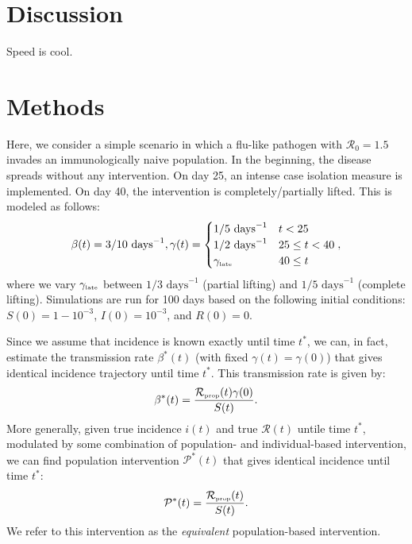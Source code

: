 \documentclass[12pt]{article}
\newcommand{\Rx}[1]{\ensuremath{{\mathcal R}_{#1}}\xspace}
\newcommand{\Ro}{\Rx{0}}
\newcommand{\RR}{\ensuremath{{\mathcal R}}\xspace}
\newcommand{\tsub}[2]{#1_{{\textrm{\tiny #2}}}}
\newcommand{\PP}{{\mathcal P}}
\begin{document}
\section{Discussion}

Speed is cool.

\section{Methods}


Here, we consider a simple scenario in which a flu-like pathogen with $\Ro = 1.5$ invades an immunologically naive population.
In the beginning, the disease spreads without any intervention.
On day 25, an intense case isolation measure is implemented. 
On day 40, the intervention is completely/partially lifted.
This is modeled as follows:
\begin{equation}
\beta(t) = 3/10\,\,\textrm{days}^{-1}, \gamma(t) = \begin{cases}
1/5\,\, \textrm{days}^{-1} & t < 25\\
1/2\,\, \textrm{days}^{-1} & 25 \leq t < 40 \\
\tsub{\gamma}{late} & 40 \leq t
\end{cases},
\end{equation}
where we vary $\tsub{\gamma}{late}$ between $1/3\,\, \textrm{days}^{-1}$ (partial lifting) and $1/5\,\, \textrm{days}^{-1}$ (complete lifting).
Simulations are run for 100 days based on the following initial conditions: $S(0) = 1 - 10^{-3}$, $I(0) = 10^{-3}$, and $R(0) = 0$.

Since we assume that incidence is known exactly until time $t^\ast$, we can, in fact, estimate the transmission rate $\beta^\ast(t)$ (with fixed $\gamma(t)=\gamma(0)$) that gives identical incidence trajectory until time $t^\ast$.
This transmission rate is given by:
\begin{equation}
\beta^\ast(t) = \frac{\tsub{\RR}{prop}(t)\gamma(0)}{S(t)}.
\end{equation}
More generally, given true incidence $i(t)$ and true $\RR(t)$ untile time $t^\ast$, modulated by some combination of population- and individual-based intervention, we can find population intervention $\PP^\ast(t)$ that gives identical incidence until time $t^\ast$:
\begin{equation}
\PP^\ast(t) = \frac{\tsub{\RR}{prop}(t)}{S(t)}.
\end{equation}
We refer to this intervention as the \emph{equivalent} population-based intervention.


\end{document}
